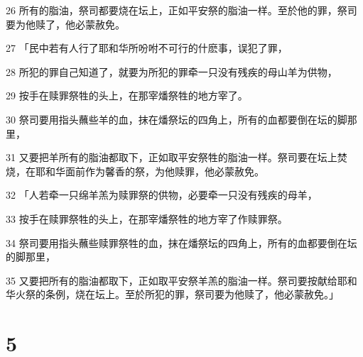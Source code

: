 \par 26 所有的脂油，祭司都要烧在坛上，正如平安祭的脂油一样。至於他的罪，祭司要为他赎了，他必蒙赦免。
\par 27 「民中若有人行了耶和华所吩咐不可行的什麽事，误犯了罪，
\par 28 所犯的罪自己知道了，就要为所犯的罪牵一只没有残疾的母山羊为供物，
\par 29 按手在赎罪祭牲的头上，在那宰燔祭牲的地方宰了。
\par 30 祭司要用指头蘸些羊的血，抹在燔祭坛的四角上，所有的血都要倒在坛的脚那里，
\par 31 又要把羊所有的脂油都取下，正如取平安祭牲的脂油一样。祭司要在坛上焚烧，在耶和华面前作为馨香的祭，为他赎罪，他必蒙赦免。
\par 32 「人若牵一只绵羊羔为赎罪祭的供物，必要牵一只没有残疾的母羊，
\par 33 按手在赎罪祭牲的头上，在那宰燔祭牲的地方宰了作赎罪祭。
\par 34 祭司要用指头蘸些赎罪祭牲的血，抹在燔祭坛的四角上，所有的血都要倒在坛的脚那里，
\par 35 又要把所有的脂油都取下，正如取平安祭羊羔的脂油一样。祭司要按献给耶和华火祭的条例，烧在坛上。至於所犯的罪，祭司要为他赎了，他必蒙赦免。」

\chapter{5}

